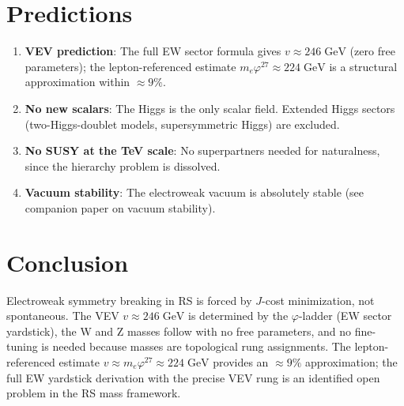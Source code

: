 \documentclass[12pt,a4paper]{article}
\theoremstyle{definition}
\theoremstyle{remark}
\begin{document}
\section{Predictions}
\label{sec:predictions}

\begin{enumerate}
  \item \textbf{VEV prediction}: The full EW sector formula gives
  $v \approx 246\;\mathrm{GeV}$ (zero free parameters); the
  lepton-referenced estimate $m_e \varphi^{27} \approx 224\;\mathrm{GeV}$
  is a structural approximation within $\approx 9\%$.

  \item \textbf{No new scalars}: The Higgs is the only scalar
  field.  Extended Higgs sectors (two-Higgs-doublet models,
  supersymmetric Higgs) are excluded.

  \item \textbf{No SUSY at the TeV scale}: No superpartners
  needed for naturalness, since the hierarchy problem is dissolved.

  \item \textbf{Vacuum stability}: The electroweak vacuum is
  absolutely stable (see companion paper on vacuum stability).
\end{enumerate}

\section{Conclusion}
\label{sec:conclusion}

Electroweak symmetry breaking in RS is forced by $J$-cost
minimization, not spontaneous.  The VEV $v \approx 246\;\mathrm{GeV}$
is determined by the $\varphi$-ladder (EW sector yardstick), the W
and Z masses follow with no free parameters, and no fine-tuning is
needed because masses are topological rung assignments.  The lepton-referenced
estimate $v \approx m_e \varphi^{27} \approx 224\;\mathrm{GeV}$ provides
an $\approx 9\%$ approximation; the full EW yardstick derivation with
the precise VEV rung is an identified open problem in the RS mass
framework.
\end{document}
